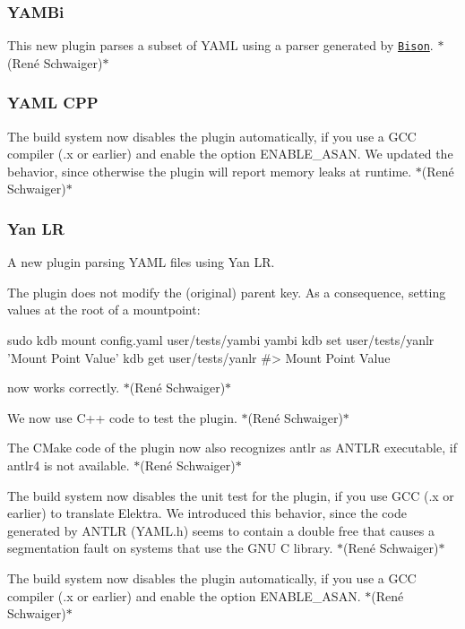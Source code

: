 \subsubsection*{Y\+A\+M\+Bi}

This new plugin parses a subset of Y\+A\+ML using a parser generated by \href{https://www.gnu.org/software/bison}{\tt Bison}. $\ast$(René Schwaiger)$\ast$

\subsubsection*{Y\+A\+ML C\+PP}

The build system now disables the plugin automatically, if you use a G\+CC compiler ({.\+x} or earlier) and enable the option {\ttfamily E\+N\+A\+B\+L\+E\+\_\+\+A\+S\+AN}. We updated the behavior, since otherwise the plugin will report memory leaks at runtime. $\ast$(René Schwaiger)$\ast$

\subsubsection*{Yan LR}

A new plugin parsing Y\+A\+ML files using Yan LR.


\begin{DoxyItemize}
\item The plugin does not modify the (original) parent key. As a consequence, setting values at the root of a mountpoint\+:
\end{DoxyItemize}


\begin{DoxyCode}
sudo kdb mount config.yaml user/tests/yambi yambi
kdb set user/tests/yanlr 'Mount Point Value'
kdb get user/tests/yanlr
#> Mount Point Value
\end{DoxyCode}


now works correctly. $\ast$(René Schwaiger)$\ast$
\begin{DoxyItemize}
\item We now use C++ code to test the plugin. $\ast$(René Schwaiger)$\ast$
\item The C\+Make code of the plugin now also recognizes {\ttfamily antlr} as A\+N\+T\+LR executable, if {\ttfamily antlr4} is not available. $\ast$(René Schwaiger)$\ast$
\item The build system now disables the unit test for the plugin, if you use G\+CC ({.\+x} or earlier) to translate Elektra. We introduced this behavior, since the code generated by A\+N\+T\+LR ({\ttfamily Y\+A\+M\+L.\+h}) seems to contain a double free that causes a segmentation fault on systems that use the G\+NU C library. $\ast$(René Schwaiger)$\ast$
\item The build system now disables the plugin automatically, if you use a G\+CC compiler ({.\+x} or earlier) and enable the option {\ttfamily E\+N\+A\+B\+L\+E\+\_\+\+A\+S\+AN}. $\ast$(René Schwaiger)$\ast$
\end{DoxyItemize}


